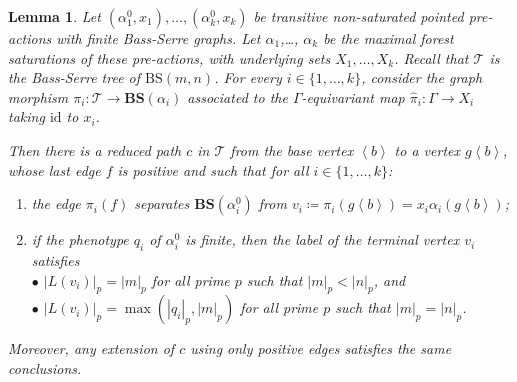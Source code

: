 \documentclass[12pt]{article}
\numberwithin{equation}{section}
\newtheorem{lemma}[equation]{Lemma}
\theoremstyle{definition}
\newcommand{\vv}{v}
\newcommand{\la}{\left\langle}
\newcommand{\ra}{\right\rangle}
\newcommand{\abs}[1]{\left\lvert #1\right\rvert}
\def\id{\mathrm{id}}
\newcommand\BSo{\mathrm{BS}}
\newcommand\BSe{\mathbf{BS}}
\newcommand\Tree{\mathcal{T}}
\begin{document}
\begin{lemma}
\label{lem: leaving the seed uniformly}
Let $(\alpha_1^0,x_1),$$\dots,(\alpha_k^0,x_k)$ 
be transitive non-saturated pointed pre-actions with finite Bass-Serre graphs.
Let $\alpha_1$,\dots, $\alpha_k$ be the maximal forest saturations of these pre-actions, with underlying sets $X_1,\dots, X_k$.
Recall that $\Tree$ is the Bass-Serre tree of $\BSo(m,n)$.
For every $i\in\{1,\dots,k\}$, consider the graph morphism $\pi_i: \Tree\to \BSe(\alpha_i)$ associated to the \( \Gamma \)-equivariant map $\hat\pi_i:\Gamma\to X_i$ taking $\id$ to $x_i$. 

Then there is a reduced path \( c \) in $\Tree$ from the base vertex $\la b\ra$ to a vertex $g \la b \ra$, whose last edge $f$ is positive and such that for all $i\in\{1,\dots,k\}$:
\begin{enumerate}[label=(\arabic*)]
    \item\label{item: separation in mfs} the edge $\pi_i(f)$ separates $\BSe(\alpha_i^0)$ from $\vv_i \coloneqq \pi_i(g\la b\ra)=x_i\alpha_i(g\la b\ra)$;
       \item\label{item: label in mfs} if the phenotype $q_i$ of $\alpha_i^0$ is finite, then the label of the terminal vertex $\vv_i$ satisfies
    \\$\bullet$
    $\abs{L(\vv_i)}_p=\abs m_p$ for all prime $p$
        such that $\abs{m}_p<\abs{n}_p$,
        and
       \\$\bullet$ $\abs{L(\vv_i)}_p=\max(\abs{q_i}_p,\abs m_p)$ for all prime $p$
        such that $\abs{m}_p=\abs{n}_p$.  
\end{enumerate}
Moreover, any extension of \( c \) using only positive edges satisfies the same conclusions.
\end{lemma}
\end{document}
